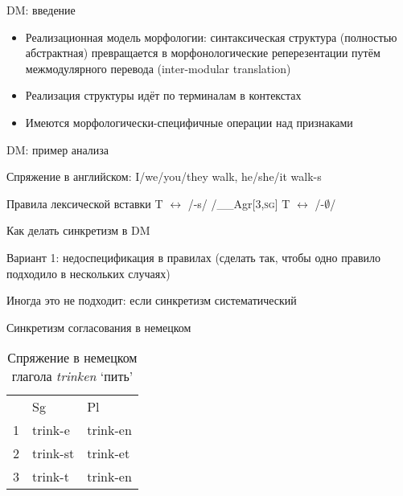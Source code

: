 \documentclass[xcolor=table]{beamer}
\begin{document}
\begin{frame}{DM: введение}

	\begin{itemize}
		\item Реализационная модель морфологии: синтаксическая структура (полностью абстрактная) превращается в морфонологические реперезентации путём межмодулярного перевода (inter-modular translation)

		\item Реализация структуры идёт по терминалам в контекстах

		\item Имеются морфологически-специфичные операции над признаками
	\end{itemize}

\end{frame}

\begin{frame}{DM: пример анализа}

	Спряжение в английском: I/we/you/they walk, he/she/it walk-s 

	\pex Правила лексической вставки
		\a T $\leftrightarrow$ /-s/ /\_\_Agr[3,\textsc{sg}]
		\a T $\leftrightarrow$ /-$\emptyset$/
	\xe

\end{frame}

\begin{frame}{Как делать синкретизм в DM}

	Вариант 1: недоспецификация в правилах (сделать так, чтобы одно правило подходило в нескольких случаях)

	Иногда это не подходит: если синкретизм систематический

\end{frame}

\begin{frame}{Синкретизм согласования в немецком}

	\begin{table}[h]
\centering
\caption{Спряжение в немецком глагола \textit{trinken} `пить'}
\begin{tabular}{lll}
   & Sg                        & Pl                         \\
1 & trink-e               & \cellcolor[HTML]{FCFF2F}trink-en \\
2 & trink-st & trink-et \\
3 & trink-t & \cellcolor[HTML]{FCFF2F}trink-en
\end{tabular}
\end{table}

\end{frame}
\end{document}
